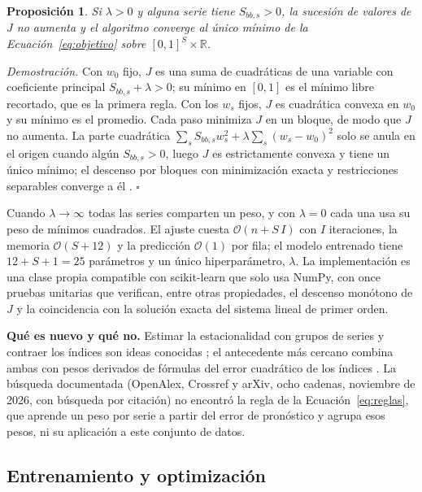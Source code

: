 \documentclass[pdflatex,sn-mathphys-num]{sn-jnl}
\theoremstyle{thmstyleone}
\newtheorem{proposition}{Proposición}
\begin{document}
\begin{proposition}\label{prop:conv}
Si $\lambda>0$ y alguna serie tiene $S_{bb,s}>0$, la sucesión de valores de $J$ no aumenta y el algoritmo converge al único mínimo de la Ecuación~\eqref{eq:objetivo} sobre $[0,1]^S\times\mathbb{R}$.
\end{proposition}

\emph{Demostración.} Con $w_0$ fijo, $J$ es una suma de cuadráticas de una variable con coeficiente principal $S_{bb,s}+\lambda>0$; su mínimo en $[0,1]$ es el mínimo libre recortado, que es la primera regla. Con los $w_s$ fijos, $J$ es cuadrática convexa en $w_0$ y su mínimo es el promedio. Cada paso minimiza $J$ en un bloque, de modo que $J$ no aumenta. La parte cuadrática $\sum_sS_{bb,s}w_s^2+\lambda\sum_s(w_s-w_0)^2$ solo se anula en el origen cuando algún $S_{bb,s}>0$, luego $J$ es estrictamente convexa y tiene un único mínimo; el descenso por bloques con minimización exacta y restricciones separables converge a él \cite{tseng2001}. $\square$

Cuando $\lambda\to\infty$ todas las series comparten un peso, y con $\lambda=0$ cada una usa su peso de mínimos cuadrados. El ajuste cuesta $\mathcal{O}(n+S\,I)$ con $I$ iteraciones, la memoria $\mathcal{O}(S+12)$ y la predicción $\mathcal{O}(1)$ por fila; el modelo entrenado tiene $12+S+1=25$ parámetros y un único hiperparámetro, $\lambda$. La implementación es una clase propia compatible con scikit-learn que solo usa NumPy, con once pruebas unitarias que verifican, entre otras propiedades, el descenso monótono de $J$ y la coincidencia con la solución exacta del sistema lineal de primer orden.

\textbf{Qué es nuevo y qué no.} Estimar la estacionalidad con grupos de series y contraer los índices son ideas conocidas \cite{bunn1993,bunn1999,miller2003,chen2007,chen2008}; el antecedente más cercano combina ambas con pesos derivados de fórmulas del error cuadrático de los índices \cite{zhang2013}. La búsqueda documentada (OpenAlex, Crossref y arXiv, ocho cadenas, noviembre de 2026, con búsqueda por citación) no encontró la regla de la Ecuación~\eqref{eq:reglas}, que aprende un peso por serie a partir del error de pronóstico y agrupa esos pesos, ni su aplicación a este conjunto de datos.

\subsection{Entrenamiento y optimización}\label{subsec:entrenamiento}
\end{document}

